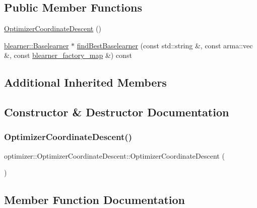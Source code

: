 \subsection*{Public Member Functions}
\begin{DoxyCompactItemize}
\item 
\hyperlink{classoptimizer_1_1_optimizer_coordinate_descent_a5c525d14644774eeade27e1affece099}{Optimizer\+Coordinate\+Descent} ()
\item 
\hyperlink{classblearner_1_1_baselearner}{blearner\+::\+Baselearner} $\ast$ \hyperlink{classoptimizer_1_1_optimizer_coordinate_descent_af657f2f5f702bddab8c640368704d18c}{find\+Best\+Baselearner} (const std\+::string \&, const arma\+::vec \&, const \hyperlink{baselearner__factory__list_8h_a058570e00ae11b882cfed36eb40be025}{blearner\+\_\+factory\+\_\+map} \&) const
\end{DoxyCompactItemize}
\subsection*{Additional Inherited Members}


\subsection{Constructor \& Destructor Documentation}
\mbox{\label{classoptimizer_1_1_optimizer_coordinate_descent_a5c525d14644774eeade27e1affece099}} 
\subsubsection{\texorpdfstring{Optimizer\+Coordinate\+Descent()}{OptimizerCoordinateDescent()}}
{\footnotesize\ttfamily optimizer\+::\+Optimizer\+Coordinate\+Descent\+::\+Optimizer\+Coordinate\+Descent (\begin{DoxyParamCaption}{ }\end{DoxyParamCaption})}



\subsection{Member Function Documentation}
\mbox{\label{classoptimizer_1_1_optimizer_coordinate_descent_af657f2f5f702bddab8c640368704d18c}} 
